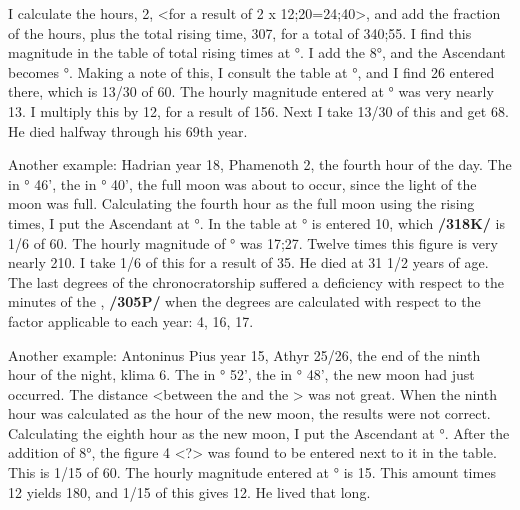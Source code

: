 I calculate the hours, 2, <for a result of 2 x 12;20=24;40>, and add the fraction of the hours, plus the total rising time, 307, for a total of 340;55. I find this magnitude in the table of total rising times at \Aquarius\xspace 29°. I add the 8°, and the Ascendant becomes \Pisces\xspace 7°. Making a note of this, I consult the table at \Pisces\xspace 7°, and I find 26 entered there, which is 13/30 of 60. The hourly magnitude entered at \Aquarius\xspace 29° was very nearly 13. I multiply this by 12, for a result of 156. Next I take 13/30 of this and get 68. He died halfway through his 69th year.

Another example: Hadrian year 18, Phamenoth 2, the fourth hour of the day. The \Sun\xspace in \Pisces\xspace 9° 46', the \Moon\xspace in \Virgo\xspace 9° 40', the full moon was about to occur, since the light of the moon was full. Calculating the fourth hour as the full moon using the rising times, I put the Ascendant at \Taurus\xspace 29°. In
the table at \Taurus\xspace 29° is entered 10, which \textbf{/318K/} is 1/6 of 60. The hourly magnitude of \Taurus\xspace 29° was 17;27. Twelve times this figure is very nearly 210. I take 1/6 of this for a result of 35. He died at 31 1/2 years of age. The last degrees of the chronocratorship suffered a deficiency with respect to the minutes of the \Sun, \textbf{/305P/} when the degrees are calculated with respect to the factor applicable to each year: 4, 16, 17.

Another example: Antoninus Pius year 15, Athyr 25/26, the end of the ninth hour of the night, klima 6. The \Sun\xspace in \Sagittarius\xspace 2° 52', the \Moon\xspace in \Sagittarius\xspace 6° 48', the new moon had just occurred. The distance <between the \Moon\xspace and the \Sun> was not great. When the ninth hour was calculated as the hour of the new moon, the results were not correct. Calculating the eighth hour as the new moon, I put the Ascendant at \Leo\xspace 12°. After the addition of 8°, the figure 4 <?> was found to be entered next to it in the table. This is 1/15 of 60. The hourly magnitude entered at \Libra\xspace 20° is 15. This amount times 12 yields 180, and 1/15 of this gives 12. He lived that long.
\newpage